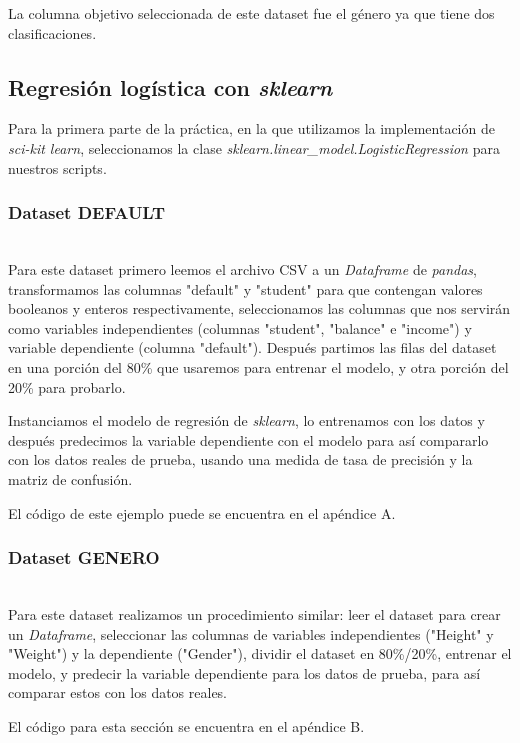 \documentclass[sigconf,authorversion,nonacm]{acmart}
\begin{document}
La columna objetivo seleccionada de este dataset fue el género ya que tiene dos clasificaciones.


\subsection{Regresión logística con \textit{sklearn}}
Para la primera parte de la práctica, en la que utilizamos la implementación de \textit{sci-kit learn}, seleccionamos la clase \newline\textit{sklearn.linear\_model.LogisticRegression}\cite{scikit-learn} para nuestros scripts.

\subsubsection{Dataset DEFAULT}\hfill\\
Para este dataset primero leemos el archivo CSV a un \textit{Dataframe} de \textit{pandas}, transformamos las columnas "default" y "student" para que contengan valores booleanos y enteros respectivamente, seleccionamos las columnas que nos servirán como variables independientes (columnas "student", "balance" e "income") y variable dependiente (columna "default"). Después partimos las filas del dataset en una porción del 80\% que usaremos para entrenar el modelo, y otra porción del 20\% para probarlo.

Instanciamos el modelo de regresión de \textit{sklearn}, lo entrenamos con los datos y después predecimos la variable dependiente con el modelo para así compararlo con los datos reales de prueba, usando una medida de tasa de precisión y la matriz de confusión.

El código de este ejemplo puede se encuentra en el apéndice A.

\subsubsection{Dataset GENERO}\hfill\\
Para este dataset realizamos un procedimiento similar: leer el dataset para crear un \textit{Dataframe}, seleccionar las columnas de variables independientes ("Height" y "Weight") y la dependiente ("Gender"), dividir el dataset en 80\%/20\%, entrenar el modelo, y predecir la variable dependiente para los datos de prueba, para así comparar estos con los datos reales.

El código para esta sección se encuentra en el apéndice B.
\end{document}
